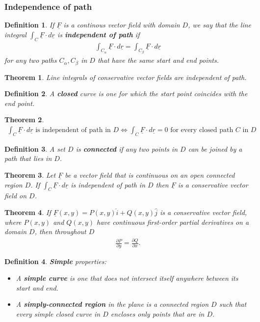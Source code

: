 \documentclass{article}
\theoremstyle{sltheorem}
\newtheorem{definition}{Definition}[section]
\newtheorem{theorem}{Theorem}[section]
\newcommand{\ih}{\widehat i}
\newcommand{\jh}{\widehat j}
\renewcommand{\vec}{\underline}
\newcommand*\B[1]{\textbf{#1}}
\begin{document}
\subsubsection{Independence of path}
\begin{definition}
    If $\vec F$ is a continous vector field with domain $D$, we say that the
    line integral $\int_C\vec F\cdot d\vec r$ is
    \B{independent of path} if
    \begin{align*}
        \int_{C_\alpha} \vec F\cdot d\vec r = \int_{C_\beta}\vec F\cdot d\vec r
    \end{align*}
    for any two paths $C_\alpha, C_\beta$ in $D$ that have the same start and
    end points.
\end{definition}
\begin{theorem}
    Line integrals of conservative vector fields are independent of path.
\end{theorem}
\begin{definition}
    A \B{closed} curve is one for which the start point coincides with the end point.
\end{definition}
\begin{theorem}
    \begin{align*}
        \int_C \vec F\cdot d\vec r \text{ is independent of path in $D$}
        \Leftrightarrow
        \int_C \vec F\cdot d\vec r = 0 \text{ for every closed path $C$ in $D$}
    \end{align*}
\end{theorem}
\begin{definition}
    A set $D$ is \B{connected} if any two points in $D$ can be joined by a
    path that lies in $D$.
\end{definition}
\begin{theorem}
    Let $\vec F$ be a vector field that is continuous on an open connected
    region $D$. If $\int_C\vec F\cdot d\vec r$ is independent of path in $D$
    then $\vec F$ is a conservative vector field on $D$.
\end{theorem}
\begin{theorem}
    If $\vec F(x,y) = P(x,y)\ih + Q(x,y)\jh$ is a conservative vector field,
    where $P(x,y)$ and $Q(x,y)$ have continuous first-order partial derivatives
    on a domain $D$, then throughout $D$
    \begin{align*}
        \frac{\partial P}{\partial y}=\frac{\partial Q}{\partial x}.
    \end{align*}
\end{theorem}
\begin{definition}
    \B{Simple} properties:
    \begin{itemize}
        \item A \B{simple curve} is one that does not intersect itself anywhere
              between its start and end.
        \item A \B{simply-connected region} in the plane is a connected region $D$
              such that every simple closed curve in $D$ encloses only points that 
              are in $D$.
    \end{itemize}
\end{definition}
\end{document}
